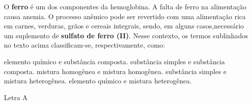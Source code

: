 \documentclass[9 pt]{scrartcl}
\author{fabio}
\date{\today}
\title{}
\def\disciplina{Química}
\def\PQ{0.84} %
\begin{document}




\begin{exercise}[points=\PQ]
O \textbf{ferro} é um dos componentes da hemoglobina. A falta de ferro na alimentação causa anemia. O processo anêmico pode ser revertido com uma alimentação rica em carnes, verduras, grãos e cereais integrais, sendo, em alguns casos,necessário um suplemento de \textbf{sulfato de ferro (II)}. Nesse contexto, os termos sublinhados no texto acima classificam-se, respectivamente, como:

\begin{choice}
\choice elemento químico e substância composta.
\choice substância simples e substância composta.
\choice mistura homogênea e mistura homogênea.
\choice substância simples e mistura heterogênea.
\choice elemento químico e mistura heterogênea.
\end{choice}
\end{exercise}
\begin{solution}
Letra A
\end{solution}
\end{document}
